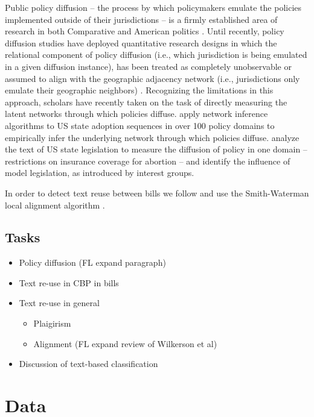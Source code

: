 \documentclass[12pt]{article} %
\begin{document}
Public policy diffusion -- the process by which policymakers emulate the policies implemented outside of their jurisdictions -- is a firmly established area of research in both Comparative \citep{simmons2004,gilardi2009} and American politics \citep{walker1969,berry1990,shipan2006,nicholson-crotty2009}. Until recently, policy diffusion studies have deployed quantitative research designs in which the relational component of policy diffusion (i.e., which jurisdiction is being emulated in a given diffusion instance), has been treated as completely unobservable or assumed to align with the geographic adjacency network (i.e., jurisdictions only emulate their geographic neighbors) \citep{volden2006,boehmke2009}. Recognizing the limitations in this approach, scholars have recently taken on the task of directly measuring the latent networks through which policies diffuse. \cite{desmarais2015} apply network inference algorithms to US state adoption sequences in over 100 policy domains to empirically infer the underlying network through which policies diffuse. \cite{garrett2015} analyze the text of US state legislation to measure the diffusion of policy in one domain -- restrictions on insurance coverage for abortion -- and identify the influence of model legislation, as introduced by interest groups.


In order to detect text reuse between bills we follow \citet{wilkerson2015tracing} and use the Smith-Waterman local alignment algorithm \citep{smith1981identification}. 

\subsection{Tasks}
\begin{itemize}
\item Policy diffusion (FL expand paragraph)
\item Text re-use in CBP in bills 
\item Text re-use in general
\begin{itemize}
\item Plaigirism
\item Alignment (FL expand review of Wilkerson et al)
\end{itemize} 
\item Discussion of text-based classification
\end{itemize}

\section{Data}
\end{document}
